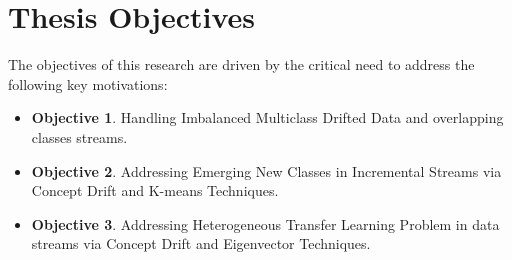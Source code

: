 \section{Thesis Objectives}
\label{sec:1_introduction_objectives}
The objectives of this research are driven by the critical need to address the following key motivations:
\begin{itemize}
    \setlength{\itemsep}{0pt}
    \setlength{\parskip}{0pt}
    \item \textbf{Objective 1}. Handling Imbalanced Multiclass Drifted Data and overlapping classes streams.
    \item \textbf{Objective 2}. Addressing Emerging New Classes in Incremental Streams via Concept Drift and K-means Techniques.
    \item \textbf{Objective 3}. Addressing Heterogeneous Transfer Learning Problem in data streams via Concept Drift and Eigenvector Techniques.
\end{itemize}
